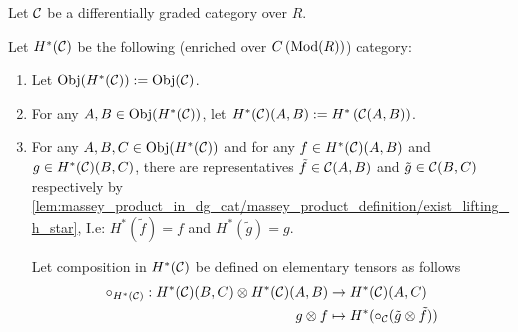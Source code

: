 \begin{definition}
    Let \( {\mathcal{C}} \) be a differentially graded category over  \( R \).

    Let \( H^*({\mathcal{C}}) \) be the following (enriched over \( C\left( \operatorname{Mod}(R) \right) \)) category:
    \begin{enumerate}
        \item Let \( \operatorname{Obj}(H^*({\mathcal{C}})) := \operatorname{Obj}({\mathcal{C}}) \).
        \item For any \( A, B \in \operatorname{Obj}(H^*({\mathcal{C}})) \), let \( H^*({\mathcal{C}})(A, B) := H^* \left( {\mathcal{C}}(A, B) \right) \).
        \item {
            For any \( A, B, C \in \operatorname{Obj}(H^*({\mathcal{C}})) \) and for any \( f \in H^*({\mathcal{C}})(A, B) \) and \( g \in H^*({\mathcal{C}})(B, C) \), there are representatives \( \tilde{f} \in {\mathcal{C}}(A, B) \) and \( \tilde{g} \in {\mathcal{C}}(B, C) \) respectively by \autoref{lem:massey_product_in_dg_cat/massey_product_definition/exist_lifting_h_star}, I.e: \( H^*(\tilde{f}) = f \) and \( H^*(\tilde{g}) = g \).

            Let composition in \( H^*({\mathcal{C}}) \) be defined on elementary tensors as follows
            \begin{align*}
                \circ_{H^*({\mathcal{C}})}: H^*({\mathcal{C}})(B, C) \otimes H^*({\mathcal{C}})(A, B) &\to H^*({\mathcal{C}})(A, C) \\
                g \otimes f &\mapsto H^*(\circ_{{\mathcal{C}}}(\tilde{g} \otimes \tilde{f}))
            \end{align*}
        }
    \end{enumerate}
\end{definition}

